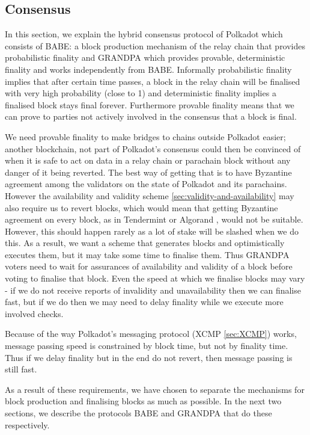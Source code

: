 \documentclass{article}
\begin{document}
\subsection{Consensus}\label{sec:consensus}

In this section, we explain the hybrid consensus protocol of Polkadot which consists of BABE: a block production mechanism of the relay chain that provides probabilistic finality and GRANDPA which provides provable, deterministic finality and works independently from BABE.  Informally probabilistic finality implies that after certain time passes, a block in the relay chain will be finalised with very high probability (close to 1) and deterministic finality implies a finalised block stays final forever. Furthermore provable finality means that we can prove to parties not actively involved in the consensus that a block is final.

We need provable finality to make bridges to chains outside Polkadot easier; another blockchain, not part of Polkadot's consensus could then be convinced of when it is safe to act on data in a relay chain or parachain block without any danger of it being reverted. The best way of getting that is to have Byzantine agreement among the validators on the state of Polkadot and its parachains. However the availability and validity scheme \ref{sec:validity-and-availability} may also require us to revert blocks, which would mean that getting Byzantine agreement on every block, as in Tendermint \cite{Tendermint} or Algorand \cite{ALGORAND}, would not be suitable. However, this should happen rarely as a lot of stake will be slashed when we do this. As a result, we want a scheme that generates blocks and optimistically executes them, but it may take some time to finalise them. Thus GRANDPA voters need to wait for assurances of availability and validity of a block before voting to finalise that block.
Even the speed at which we finalise blocks may vary - if we do not receive reports of invalidity and unavailability then we can finalise fast, but if we do then we may need to delay finality while we execute more involved checks. 

Because of the way Polkadot's messaging protocol (XCMP \ref{sec:XCMP}) works, message passing speed is constrained by block time, but not by finality time. Thus if we delay finality but in the end do not revert, then message passing is still fast.

As a result of these requirements, we have chosen to separate the mechanisms for block production and finalising blocks as much as possible. In the next two sections, we describe the protocols BABE and GRANDPA that do these respectively.
\end{document}
